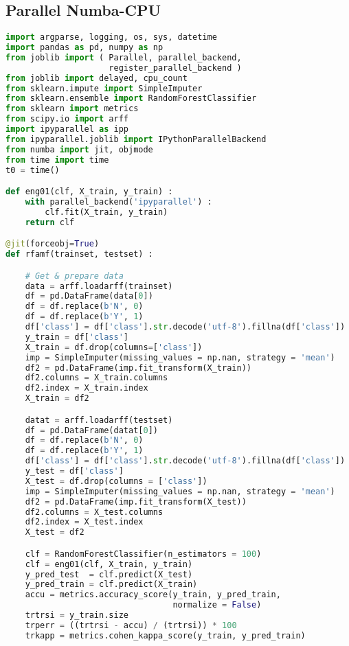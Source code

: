 \subsection{Parallel Numba-CPU}
\begin{lstlisting}[language=Python, caption={Parallel Numba-CPU implementation of the RF test case.}]
import argparse, logging, os, sys, datetime
import pandas as pd, numpy as np
from joblib import ( Parallel, parallel_backend, 
                     register_parallel_backend )
from joblib import delayed, cpu_count
from sklearn.impute import SimpleImputer
from sklearn.ensemble import RandomForestClassifier
from sklearn import metrics
from scipy.io import arff
import ipyparallel as ipp
from ipyparallel.joblib import IPythonParallelBackend
from numba import jit, objmode
from time import time
t0 = time()

def eng01(clf, X_train, y_train) :
    with parallel_backend('ipyparallel') :
        clf.fit(X_train, y_train)
    return clf

@jit(forceobj=True)
def rfamf(trainset, testset) :

    # Get & prepare data
    data = arff.loadarff(trainset)
    df = pd.DataFrame(data[0])
    df = df.replace(b'N', 0)
    df = df.replace(b'Y', 1)
    df['class'] = df['class'].str.decode('utf-8').fillna(df['class'])
    y_train = df['class']
    X_train = df.drop(columns=['class'])
    imp = SimpleImputer(missing_values = np.nan, strategy = 'mean')
    df2 = pd.DataFrame(imp.fit_transform(X_train))
    df2.columns = X_train.columns
    df2.index = X_train.index
    X_train = df2

    datat = arff.loadarff(testset)
    df = pd.DataFrame(datat[0])
    df = df.replace(b'N', 0)
    df = df.replace(b'Y', 1)
    df['class'] = df['class'].str.decode('utf-8').fillna(df['class'])
    y_test = df['class']
    X_test = df.drop(columns = ['class'])
    imp = SimpleImputer(missing_values = np.nan, strategy = 'mean')
    df2 = pd.DataFrame(imp.fit_transform(X_test))
    df2.columns = X_test.columns
    df2.index = X_test.index
    X_test = df2

    clf = RandomForestClassifier(n_estimators = 100)
    clf = eng01(clf, X_train, y_train)
    y_pred_test  = clf.predict(X_test)
    y_pred_train = clf.predict(X_train)
    accu = metrics.accuracy_score(y_train, y_pred_train,
                                  normalize = False)
    trtrsi = y_train.size
    trperr = ((trtrsi - accu) / (trtrsi)) * 100
    trkapp = metrics.cohen_kappa_score(y_train, y_pred_train)
    

\end{lstlisting}
